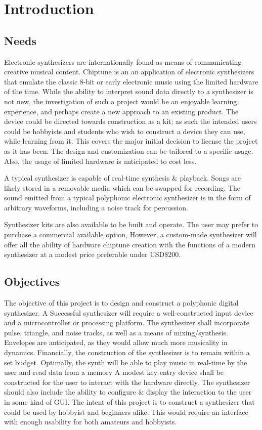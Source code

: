 \documentclass[bibtotocnumbered,abstract=on,paper=a4,fontsize=12pt,parskip=on,halfparskip=on]{scrartcl}		%
\begin{document}
\section{Introduction}
  \subsection{Needs}
Electronic synthesizers are internationally found as means of communicating creative musical content. Chiptune is an an application of electronic synthesizers that emulate the classic 8-bit or early electronic music using the limited hardware of the time. While the ability to interpret sound data directly to a synthesizer is not new, the investigation of such a project would be an enjoyable learning experience, and perhaps create a new approach to an existing product.  The device could be directed towards construction as a kit; as such the intended users could be hobbyists and students who wish to construct a device they can use, while learning from it. This covers the major initial decision to license the project as it has been. The design and customization can be tailored to a specific usage. Also, the usage of limited hardware is anticipated to cost less.

A typical synthesizer is capable of real-time synthesis \& playback. Songs are likely stored in a removable media which can be swapped for recording. The sound emitted from a typical polyphonic electronic synthesizer is in the form of arbitrary waveforms, including a noise track for percussion.

Synthesizer kits are also available to be built and operate. The user may prefer to purchase a commercial available option, However, a custom-made synthesizer will offer all the ability of hardware chiptune creation with the functions of a modern synthesizer at a modest price preferable under USD\$200. 
  \subsection{Objectives}
The objective of this project is to design and construct a polyphonic digital synthesizer. A Successful synthesizer will require a well-constructed input device and a microcontroller or processing platform. The synthesizer shall incorporate pulse, triangle, and noise tracks, as well as a means of mixing/synthesis. Envelopes are anticipated, as they would allow much more musicality in dynamics. Financially, the construction of the synthesizer is to remain within a set budget. Optimally, the synth will be able to play music in real-time by the user and read data from a memory A modest key entry device shall be constructed for the user to interact with the hardware directly. The synthesizer should also include the ability to configure \& display the interaction to the user in some kind of GUI. The intent of this project is to construct a synthesizer that could be used by hobbyist and beginners alike. This would require an interface with enough usability for both amateurs and hobbyists.
\clearpage
\end{document}
